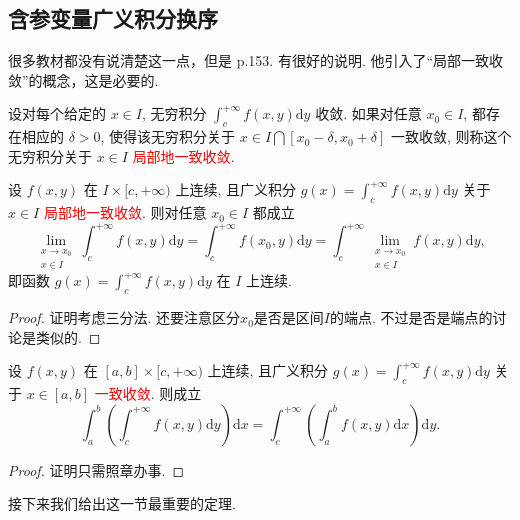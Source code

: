 \subsection{含参变量广义积分换序}
很多教材都没有说清楚这一点，但是\cite{崔尚斌} p.153. 有很好的说明. 他引入了“局部一致收敛”的概念，这是必要的.
\begin{definition}[局部一致收敛]
    设对每个给定的 $x \in I$, 无穷积分 $\int_c^{+\infty} f(x, y) \mathrm{d} y$ 收敛. 如果对任意 $x_0 \in I$, 都存在相应的 $\delta>0$, 使得该无穷积分关于 $x \in I \bigcap\left[x_0-\delta, x_0+\delta\right]$ 一致收敛, 则称这个无穷积分关于 $x \in I$ \textcolor{red}{局部地一致收敛}.
\end{definition}
\begin{theorem}[极限和积分交换次序]\label{thm:limit-and-integral-exchange}
    设 $f(x, y)$ 在 $I \times[c,+\infty)$ 上连续, 且广义积分 $g(x)=\int_c^{+\infty} f(x, y) \mathrm{d} y$ 关于 $x \in I$ \textcolor{red}{局部地一致收敛}. 则对任意 $x_0 \in I$ 都成立
    \[
    \lim _{\substack{x \rightarrow x_0 \\ x \in I}} \int_c^{+\infty} f(x, y) \mathrm{d} y=\int_c^{+\infty} f\left(x_0, y\right) \mathrm{d} y=\int_c^{+\infty} \lim _{\substack{x \rightarrow x_0 \\ x \in I}} f(x, y) \mathrm{d} y,
    \]
    即函数 $g(x)=\int_c^{+\infty} f(x, y) \mathrm{d} y$ 在 $I$ 上连续.
\end{theorem}
\begin{proof}
    证明考虑三分法. 还要注意区分$x_0$是否是区间$I$的端点. 不过是否是端点的讨论是类似的.
\end{proof}
\begin{theorem}[积分交换次序]\label{thm:integral-exchange}
    设 $f(x, y)$ 在 $[a, b] \times[c,+\infty)$ 上连续, 且广义积分 $g(x)=\int_c^{+\infty} f(x, y) \mathrm{d} y$ 关于 $x \in[a, b]$ \textcolor{red}{一致收敛}. 则成立
    \[
    \int_a^b\left(\int_c^{+\infty} f(x, y) \mathrm{d} y\right) \mathrm{d} x=\int_c^{+\infty}\left(\int_a^b f(x, y) \mathrm{d} x\right) \mathrm{d} y .
    \]
\end{theorem}
\begin{proof}
    证明只需照章办事.
\end{proof}
接下来我们给出这一节最重要的定理.
